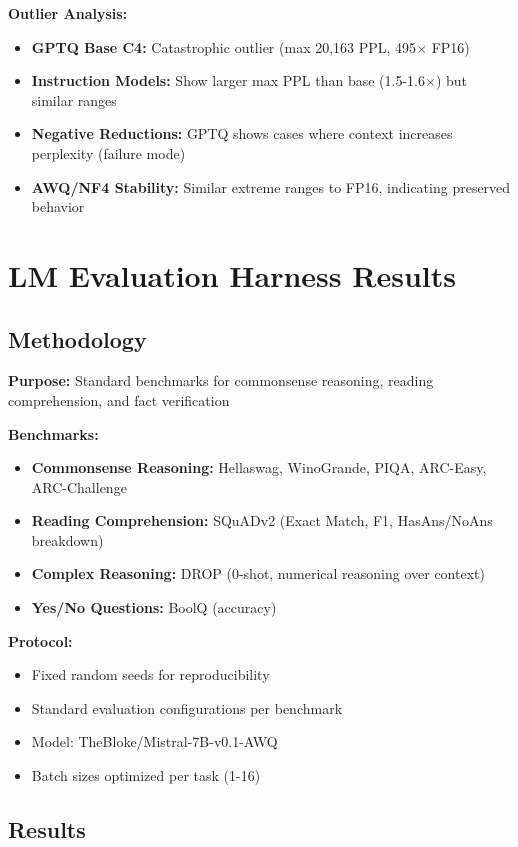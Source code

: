 \documentclass[11pt,a4paper]{article}
\begin{document}
\textbf{Outlier Analysis:}
\begin{itemize}
\item \textbf{GPTQ Base C4:} Catastrophic outlier (max 20,163 PPL, 495$\times$ FP16)
\item \textbf{Instruction Models:} Show larger max PPL than base (1.5-1.6$\times$) but similar ranges
\item \textbf{Negative Reductions:} GPTQ shows cases where context increases perplexity (failure mode)
\item \textbf{AWQ/NF4 Stability:} Similar extreme ranges to FP16, indicating preserved behavior
\end{itemize}

\newpage
\section{LM Evaluation Harness Results}

\subsection{Methodology}

\textbf{Purpose:} Standard benchmarks for commonsense reasoning, reading comprehension, and fact verification

\textbf{Benchmarks:}
\begin{itemize}
\item \textbf{Commonsense Reasoning:} Hellaswag, WinoGrande, PIQA, ARC-Easy, ARC-Challenge
\item \textbf{Reading Comprehension:} SQuADv2 (Exact Match, F1, HasAns/NoAns breakdown)
\item \textbf{Complex Reasoning:} DROP (0-shot, numerical reasoning over context)
\item \textbf{Yes/No Questions:} BoolQ (accuracy)
\end{itemize}

\textbf{Protocol:}
\begin{itemize}
\item Fixed random seeds for reproducibility
\item Standard evaluation configurations per benchmark
\item Model: TheBloke/Mistral-7B-v0.1-AWQ
\item Batch sizes optimized per task (1-16)
\end{itemize}

\subsection{Results}
\end{document}
